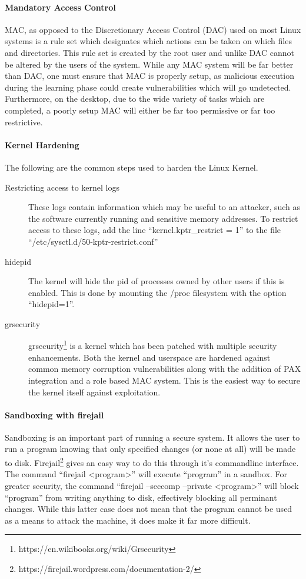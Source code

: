 \documentclass[a4paper,11pt]{article}
\begin{document}
			\paragraph{Mandatory Access Control}
				MAC, as opposed to the Discretionary Access Control (DAC) used on most Linux systems is a rule set which designates which actions can be taken on which files and directories. 
				This rule set is created by the root user and unlike DAC cannot be altered by the users of the system. 
				While any MAC system will be far better than DAC, one must ensure that MAC is properly setup, as malicious execution during the learning phase could create vulnerabilities which will go undetected. 
				Furthermore, on the desktop, due to the wide variety of tasks which are completed, a poorly setup MAC will either be far too permissive or far too restrictive. 
			\paragraph{Kernel Hardening}
				The following are the common steps used to harden the Linux Kernel. 
				\begin{description}
					\item[Restricting access to kernel logs]
						These logs contain information which may be useful to an attacker, such as the software currently running and sensitive memory addresses. 
						To restrict access to these logs, add the line ``kernel.kptr\_restrict = 1'' to the file ``/etc/sysctl.d/50-kptr-restrict.conf''
					\item[hidepid] 
						The kernel will hide the pid of processes owned by other users if this is enabled. This is done by mounting the /proc filesystem with the option ``hidepid=1''. 
					\item[grsecurity]
						grsecurity\footnote{https://en.wikibooks.org/wiki/Grsecurity} is a kernel which has been patched with multiple security enhancements. 
						Both the kernel and userspace are hardened against common memory corruption vulnerabilities along with the addition of PAX integration and a role based MAC system. This is the easiest way to secure the kernel itself against exploitation. 
				\end{description}
				\paragraph{Sandboxing with firejail}
					Sandboxing is an important part of running a secure system. 
					It allows the user to run a program knowing that only specified changes (or none at all) will be made to disk. 
					Firejail\footnote{https://firejail.wordpress.com/documentation-2/} gives an easy way to do this through it's commandline interface. 
					The command ``firejail <program>'' will execute ``program'' in a sandbox. 
					For greater security, the command ``firejail --seccomp --private <program>'' will block ``program'' from writing anything to disk, effectively blocking all perminant changes. 
					While this latter case does not mean that the program cannot be used as a means to attack the machine, it does make it far more difficult. 
\end{document}
